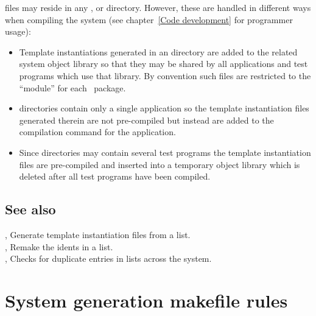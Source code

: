  files may reside in any ,  or 
directory.  However, these are handled in different ways when compiling the
system (see chapter~\ref{Code development} for programmer usage):
\begin{itemize}
\item
   Template instantiations generated in an  directory are
   added to the related system object library so that they may be shared by
   all applications and test programs which use that library.  By convention
   such  files are restricted to the 
   ``module'' for each \aipspp\ package.
\item
    directories contain only a single application so the template
   instantiation files generated therein are not pre-compiled but instead are
   added to the compilation command for the application.
\item
   Since  directories may contain several test programs the template
   instantiation files are pre-compiled and inserted into a temporary object
   library which is deleted after all test programs have been compiled.
\end{itemize}
 
\subsection*{See also}
 
, Generate template instantiation files from a list.\\
, Remake the idents in a  list.\\
, Checks for duplicate entries in  lists
   across the system.
 
\newpage
\section{System generation makefile rules}
\label{System generation makefile rules}
 
